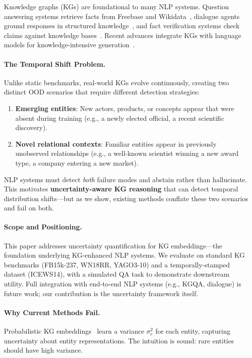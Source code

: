 
Knowledge graphs (KGs) are foundational to many NLP systems.
Question answering systems retrieve facts from Freebase and Wikidata~\citep{bordes2015large}, dialogue agents ground responses in structured knowledge~\citep{moon2019opendialkg}, and fact verification systems check claims against knowledge bases~\citep{thorne2018fever}.
Recent advances integrate KGs with language models for knowledge-intensive generation~\citep{liu2020k,wang2021kepler}.

\paragraph{The Temporal Shift Problem.}
Unlike static benchmarks, real-world KGs evolve continuously, creating two distinct OOD scenarios that require different detection strategies:
\begin{enumerate}
    \item \textbf{Emerging entities}: New actors, products, or concepts appear that were absent during training (e.g., a newly elected official, a recent scientific discovery).
    \item \textbf{Novel relational contexts}: Familiar entities appear in previously unobserved relationships (e.g., a well-known scientist winning a new award type, a company entering a new market).
\end{enumerate}
NLP systems must detect \emph{both} failure modes and abstain rather than hallucinate.
This motivates \textbf{uncertainty-aware KG reasoning} that can detect temporal distribution shifts---but as we show, existing methods conflate these two scenarios and fail on both.

\paragraph{Scope and Positioning.}
This paper addresses uncertainty quantification for KG embeddings---the foundation underlying KG-enhanced NLP systems.
We evaluate on standard KG benchmarks (FB15k-237, WN18RR, YAGO3-10) and a temporally-stamped dataset (ICEWS14), with a simulated QA task to demonstrate downstream utility.
Full integration with end-to-end NLP systems (e.g., KGQA, dialogue) is future work; our contribution is the uncertainty framework itself.

\paragraph{Why Current Methods Fail.}
Probabilistic KG embeddings~\citep{Chen2021PERM,chen2021probabilistic} learn a variance $\sigma^2_e$ for each entity, capturing uncertainty about entity representations.
The intuition is sound: rare entities should have high variance.

